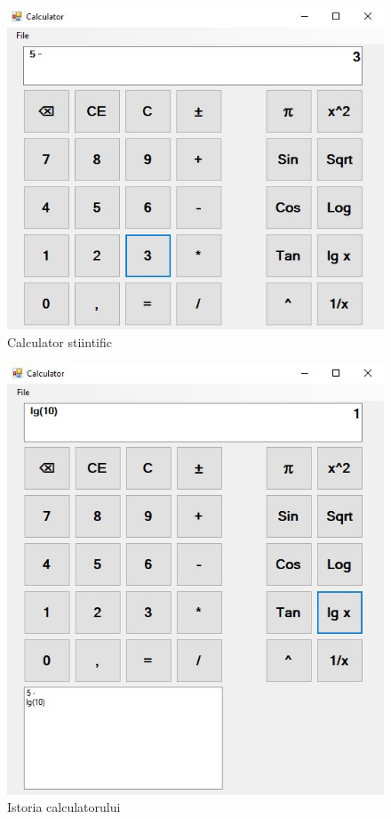 \begin{figure}[!ht]
	
	\centering
	
	\includegraphics[width=1.0\textwidth]{Cattura1.JPG}
	
	\caption{Calculator stiintific}
	
	\label{Im_label}
	
\end{figure}

\begin{figure}[!ht]
	
	\centering
	
	\includegraphics[width=1.0\textwidth]{Cattura2.JPG}
	
	\caption{Istoria calculatorului}
	
	\label{Im_label}
	
\end{figure}




\clearpage
        

